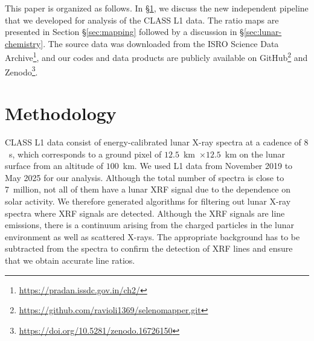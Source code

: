 \documentclass[twocolumn]{aastex631}
\begin{document}
This paper is organized as follows. In \S\ref{sec:methodolgy}, we discuss the new independent pipeline that we developed for analysis of the CLASS L1 data.
The ratio maps are presented in Section \S\ref{sec:mapping} followed by a discussion in \S\ref{sec:lunar-chemistry}. 
The source data was downloaded from the ISRO Science Data Archive\footnote{\url{https://pradan.issdc.gov.in/ch2/}}, and our codes and data products are publicly available on GitHub\footnote{\url{https://github.com/ravioli1369/selenomapper.git}} and Zenodo\footnote{\url{https://doi.org/10.5281/zenodo.16726150}}.

\section{Methodology}\label{sec:methodolgy}

CLASS L1 data consist of energy-calibrated lunar X-ray spectra at a cadence of $8$~s, which corresponds to a ground pixel of $12.5$~km~$\times 12.5$~km on the lunar surface from an altitude of $100$~km. We used L1 data from November 2019 to May 2025 for our analysis. Although the total number of spectra is close to 7~million, not all of them have a lunar XRF signal due to the dependence on solar activity. We therefore generated algorithms for filtering out lunar X-ray spectra where XRF signals are detected. Although the XRF signals are line emissions, there is a continuum arising from the charged particles in the lunar environment as well as scattered X-rays. The appropriate background has to be subtracted from the spectra to confirm the detection of XRF lines and ensure that we obtain accurate line ratios.
\end{document}
